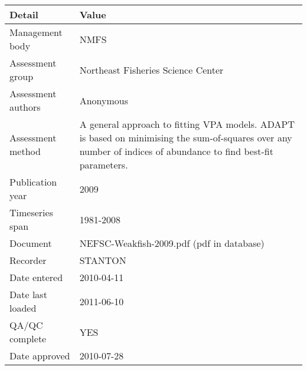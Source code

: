 \begin{table}[htb]
\centering
\begin{tabular}{lp{7cm}}
\toprule
Detail & Value \\
\midrule
Management body    & NMFS                                                                                                                                                           \\
Assessment group   & Northeast Fisheries Science Center                                                                                                                             \\
Assessment authors & Anonymous                                                                                                                                                      \\
Assessment method  & A general approach to fitting VPA models. ADAPT is based on minimising the sum-of-squares over any number of indices of abundance to find best-fit parameters. \\
Publication year   & 2009                                                                                                                                                           \\
Timeseries span    & 1981-2008                                                                                                                                                      \\
Document           & NEFSC-Weakfish-2009.pdf (pdf in database)                                                                                                                      \\
Recorder           & STANTON                                                                                                                                                        \\
Date entered       & 2010-04-11                                                                                                                                                     \\
Date last loaded   & 2011-06-10                                                                                                                                                     \\
QA/QC complete     & YES                                                                                                                                                            \\
Date approved      & 2010-07-28                                                                                                                                                     \\
\bottomrule
\end{tabular}
\label{tab:assessdet}
\end{table}
